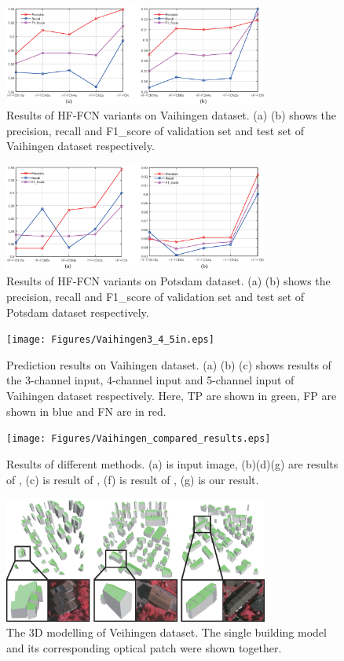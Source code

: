 \begin{figure}
\centering
\includegraphics[width=8.7cm]{Figures/vaihingen_variants.eps}
\caption{Results of HF-FCN variants on Vaihingen dataset. (a) (b) shows the precision, recall and F1\_score of validation set and test set of Vaihingen dataset respectively.}
\label{11}
\end{figure}

\begin{figure}
\centering
\includegraphics[width=8.7cm]{Figures/Potsdam_variants.eps}
\caption{Results of HF-FCN variants on Potsdam dataset. (a) (b) shows the precision, recall and F1\_score of validation set and test set of Potsdam dataset respectively.}
\label{12}
\end{figure}

\begin{figure}
\centering
\texttt{[image: Figures/Vaihingen3\_4\_5in.eps]}
\caption{Prediction results on Vaihingen dataset. (a) (b) (c) shows results of the 3-channel input, 4-channel input and 5-channel input of Vaihingen dataset respectively. Here, TP are shown in green, FP are shown in blue and FN are in red.}
\label{13}
\end{figure}

\begin{figure}
\centering
\texttt{[image: Figures/Vaihingen\_compared\_results.eps]}
\caption{Results of different methods. (a) is input image, (b)(d)(g) are results of \cite{IEEEexample:audebert2017deep}, (c) is result of \cite{IEEEexample:marmanis2016semantic}, (f) is result of \cite{IEEEexample:unknown}, (g) is our result.}
\label{14}
\end{figure}

\begin{figure}
\centering
\includegraphics[width=8.7cm]{Figures/Vaihigen_3Dmodelling.eps}
\caption{The 3D modelling of Veihingen dataset. The single building model and its corresponding optical patch were shown together.}
\label{15}
\end{figure}



